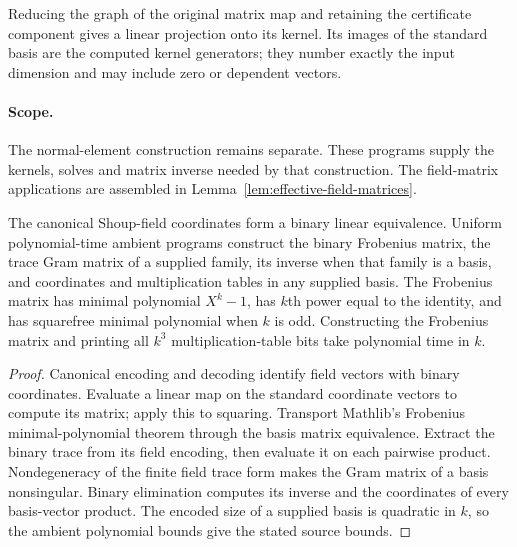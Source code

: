 Reducing the graph of the original matrix map and retaining the certificate
component gives a linear projection onto its kernel. Its images of the standard
basis are the computed kernel generators; they number exactly the input dimension
and may include zero or dependent vectors.
\paragraph{Scope.} The normal-element construction remains separate. These programs
supply the kernels, solves and matrix inverse needed by that construction.
The field-matrix applications are assembled in Lemma~\ref{lem:effective-field-matrices}.

\begin{lemma}
\label{lem:effective-field-matrices}
\leanok
The canonical Shoup-field coordinates form a binary linear equivalence. Uniform
polynomial-time ambient programs construct the binary Frobenius matrix, the trace
Gram matrix of a supplied family, its inverse when that family is a basis,
and coordinates and multiplication tables in any supplied basis. The Frobenius
matrix has minimal polynomial $X^k-1$, has $k$th power equal to the identity, and
has squarefree minimal polynomial when $k$ is odd. Constructing the Frobenius
matrix and printing all $k^3$ multiplication-table bits take polynomial time in $k$.
\end{lemma}
\begin{proof}
\leanok
Canonical encoding and decoding identify field vectors with binary coordinates.
Evaluate a linear map on the standard coordinate vectors to compute its matrix;
apply this to squaring. Transport Mathlib's Frobenius minimal-polynomial theorem
through the basis matrix equivalence. Extract the binary trace from its field
encoding, then evaluate it on each pairwise product. Nondegeneracy of the finite
field trace form makes the Gram matrix of a basis nonsingular. Binary elimination
computes its inverse and the coordinates of every basis-vector product. The
encoded size of a supplied basis is quadratic in $k$, so the ambient polynomial
bounds give the stated source bounds.
\end{proof}
